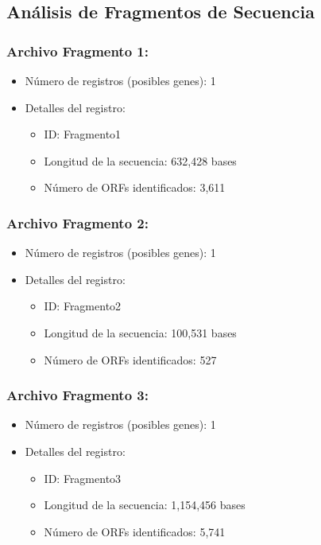 \subsection*{Análisis de Fragmentos de Secuencia}

\subsubsection*{Archivo Fragmento 1:}
\begin{itemize}
\item Número de registros (posibles genes): 1
\item Detalles del registro:
  \begin{itemize}
  \item ID: Fragmento1
  \item Longitud de la secuencia: 632,428 bases
  \item Número de ORFs identificados: 3,611
  \end{itemize}
\end{itemize}

\subsubsection*{Archivo Fragmento 2:}
\begin{itemize}
\item Número de registros (posibles genes): 1
\item Detalles del registro:
  \begin{itemize}
  \item ID: Fragmento2
  \item Longitud de la secuencia: 100,531 bases
  \item Número de ORFs identificados: 527
  \end{itemize}
\end{itemize}

\subsubsection*{Archivo Fragmento 3:}
\begin{itemize}
\item Número de registros (posibles genes): 1
\item Detalles del registro:
  \begin{itemize}
  \item ID: Fragmento3
  \item Longitud de la secuencia: 1,154,456 bases
  \item Número de ORFs identificados: 5,741
  \end{itemize}
\end{itemize}

